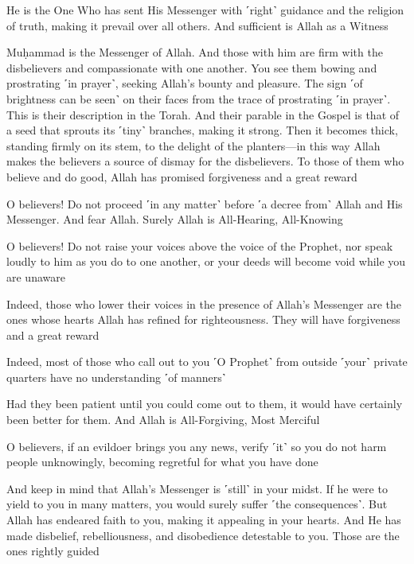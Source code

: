 He is the One Who has sent His Messenger with ˹right˺ guidance and the religion of truth, making it prevail over all others. And sufficient is Allah as a Witness

Muḥammad is the Messenger of Allah. And those with him are firm with the disbelievers and compassionate with one another. You see them bowing and prostrating ˹in prayer˺, seeking Allah’s bounty and pleasure. The sign ˹of brightness can be seen˺ on their faces from the trace of prostrating ˹in prayer˺. This is their description in the Torah. And their parable in the Gospel is that of a seed that sprouts its ˹tiny˺ branches, making it strong. Then it becomes thick, standing firmly on its stem, to the delight of the planters—in this way Allah makes the believers a source of dismay for the disbelievers. To those of them who believe and do good, Allah has promised forgiveness and a great reward

O believers! Do not proceed ˹in any matter˺ before ˹a decree from˺ Allah and His Messenger. And fear Allah. Surely Allah is All-Hearing, All-Knowing

O believers! Do not raise your voices above the voice of the Prophet, nor speak loudly to him as you do to one another, or your deeds will become void while you are unaware

Indeed, those who lower their voices in the presence of Allah’s Messenger are the ones whose hearts Allah has refined for righteousness. They will have forgiveness and a great reward

Indeed, most of those who call out to you ˹O Prophet˺ from outside ˹your˺ private quarters have no understanding ˹of manners˺

Had they been patient until you could come out to them, it would have certainly been better for them. And Allah is All-Forgiving, Most Merciful

O believers, if an evildoer brings you any news, verify ˹it˺ so you do not harm people unknowingly, becoming regretful for what you have done

And keep in mind that Allah’s Messenger is ˹still˺ in your midst. If he were to yield to you in many matters, you would surely suffer ˹the consequences˺. But Allah has endeared faith to you, making it appealing in your hearts. And He has made disbelief, rebelliousness, and disobedience detestable to you. Those are the ones rightly guided

